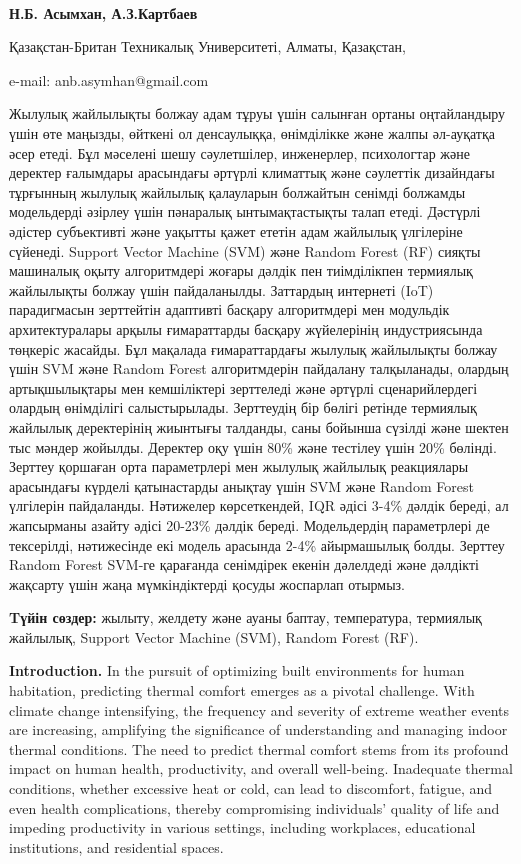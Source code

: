 {\bfseries Н.Б. Асымхан\textsuperscript{\envelope }, А.З.Картбаев}

Қазақстан-Британ Техникалық Университеті, Алматы, Қазақстан,

e-mail: anb.asymhan@gmail.com

Жылулық жайлылықты болжау адам тұруы үшін салынған ортаны оңтайландыру
үшін өте маңызды, өйткені ол денсаулыққа, өнімділікке және жалпы
әл-ауқатқа әсер етеді. Бұл мәселені шешу сәулетшілер, инженерлер,
психологтар және деректер ғалымдары арасындағы әртүрлі климаттық және
сәулеттік дизайндағы тұрғынның жылулық жайлылық қалауларын болжайтын
сенімді болжамды модельдерді әзірлеу үшін пәнаралық ынтымақтастықты
талап етеді. Дәстүрлі әдістер субъективті және уақытты қажет ететін адам
жайлылық үлгілеріне сүйенеді. Support Vector Machine (SVM) және Random
Forest (RF) сияқты машиналық оқыту алгоритмдері жоғары дәлдік пен
тиімділікпен термиялық жайлылықты болжау үшін пайдаланылды. Заттардың
интернеті (IoT) парадигмасын зерттейтін адаптивті басқару алгоритмдері
мен модульдік архитектуралары арқылы ғимараттарды басқару жүйелерінің
индустриясында төңкеріс жасайды. Бұл мақалада ғимараттардағы жылулық
жайлылықты болжау үшін SVM және Random Forest алгоритмдерін пайдалану
талқыланады, олардың артықшылықтары мен кемшіліктері зерттеледі және
әртүрлі сценарийлердегі олардың өнімділігі салыстырылады. Зерттеудің бір
бөлігі ретінде термиялық жайлылық деректерінің жиынтығы талданды, саны
бойынша сүзілді және шектен тыс мәндер жойылды. Деректер оқу үшін 80\%
және тестілеу үшін 20\% бөлінді. Зерттеу қоршаған орта параметрлері мен
жылулық жайлылық реакциялары арасындағы күрделі қатынастарды анықтау
үшін SVM және Random Forest үлгілерін пайдаланды. Нәтижелер
көрсеткендей, IQR әдісі 3-4\% дәлдік береді, ал жапсырманы азайту әдісі
20-23\% дәлдік береді. Модельдердің параметрлері де тексерілді,
нәтижесінде екі модель арасында 2-4\% айырмашылық болды. Зерттеу Random
Forest SVM-ге қарағанда сенімдірек екенін дәлелдеді және дәлдікті
жақсарту үшін жаңа мүмкіндіктерді қосуды жоспарлап отырмыз.

{\bfseries Tүйін сөздер:} жылыту, желдету және ауаны баптау, температура,
термиялық жайлылық, Support Vector Machine (SVM), Random Forest (RF).

{\bfseries Introduction.} In the pursuit of optimizing built environments
for human habitation, predicting thermal comfort emerges as a pivotal
challenge. With climate change intensifying, the frequency and severity
of extreme weather events are increasing, amplifying the significance of
understanding and managing indoor thermal conditions. The need to
predict thermal comfort stems from its profound impact on human health,
productivity, and overall well-being. Inadequate thermal conditions,
whether excessive heat or cold, can lead to discomfort, fatigue, and
even health complications, thereby compromising individuals' quality of
life and impeding productivity in various settings, including
workplaces, educational institutions, and residential spaces.

